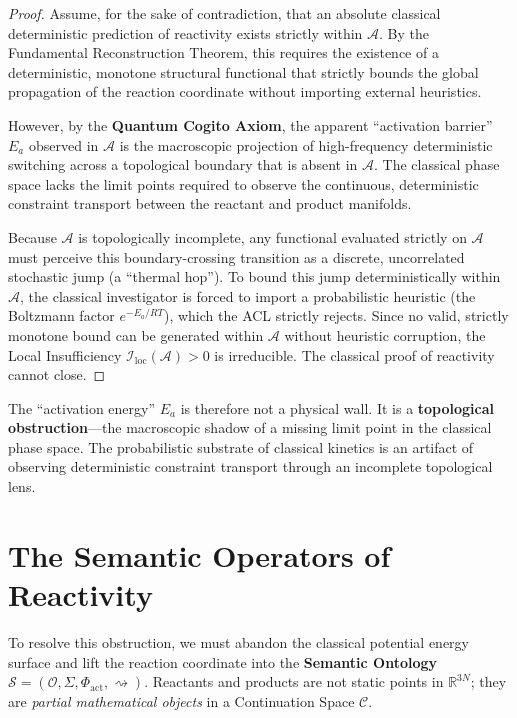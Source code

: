 \documentclass[11pt,openany]{extbook}
\theoremstyle{plain}
\theoremstyle{definition}
\begin{document}
\begin{proof}
Assume, for the sake of contradiction, that an absolute classical deterministic prediction of reactivity exists strictly within $\mathcal{A}$. By the Fundamental Reconstruction Theorem, this requires the existence of a deterministic, monotone structural functional that strictly bounds the global propagation of the reaction coordinate without importing external heuristics.

However, by the \textbf{Quantum Cogito Axiom}, the apparent ``activation barrier'' $E_a$ observed in $\mathcal{A}$ is the macroscopic projection of high-frequency deterministic switching across a topological boundary that is absent in $\mathcal{A}$. The classical phase space lacks the limit points required to observe the continuous, deterministic constraint transport between the reactant and product manifolds.

Because $\mathcal{A}$ is topologically incomplete, any functional evaluated strictly on $\mathcal{A}$ must perceive this boundary-crossing transition as a discrete, uncorrelated stochastic jump (a ``thermal hop''). To bound this jump deterministically within $\mathcal{A}$, the classical investigator is forced to import a probabilistic heuristic (the Boltzmann factor $e^{-E_a/RT}$), which the ACL strictly rejects. Since no valid, strictly monotone bound can be generated within $\mathcal{A}$ without heuristic corruption, the Local Insufficiency $\mathcal{I}_{\mathrm{loc}}(\mathcal{A}) > 0$ is irreducible. The classical proof of reactivity cannot close.
\end{proof}

The ``activation energy'' $E_a$ is therefore not a physical wall. It is a \textbf{topological obstruction}---the macroscopic shadow of a missing limit point in the classical phase space. The probabilistic substrate of classical kinetics is an artifact of observing deterministic constraint transport through an incomplete topological lens.

\section{The Semantic Operators of Reactivity}

To resolve this obstruction, we must abandon the classical potential energy surface and lift the reaction coordinate into the \textbf{Semantic Ontology} $\mathcal{S} = (\mathcal{O}, \Sigma, \Phi_{\mathrm{act}}, \rightsquigarrow)$. Reactants and products are not static points in $\mathbb{R}^{3N}$; they are \emph{partial mathematical objects} in a Continuation Space $\mathcal{C}$.
\end{document}
